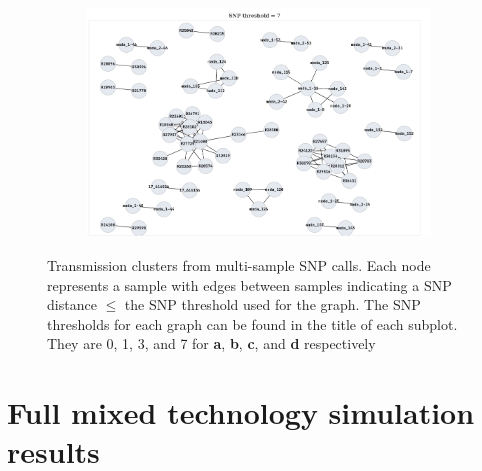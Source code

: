 \begin{figure}
\begin{subfigure}[b]{0.45\textwidth}
         \caption{}
     \end{subfigure}
     \hfill
     \begin{subfigure}[b]{0.45\textwidth}
         \centering
         \includegraphics[width=\textwidth]{Appendix1/Figs/compare_clusters_t7.png}
         \caption{}
     \end{subfigure}
        \caption{Transmission clusters from \pandora{} multi-sample SNP calls. Each node represents a sample with edges between samples indicating a SNP distance $\le$ the SNP threshold used for the graph. The SNP thresholds for each graph can be found in the title of each subplot. They are 0, 1, 3, and 7 for \textbf{a}, \textbf{b}, \textbf{c}, and \textbf{d} respectively}
        \label{fig:compare-original-clusters}
\end{figure}

\section{Full mixed technology simulation results}

